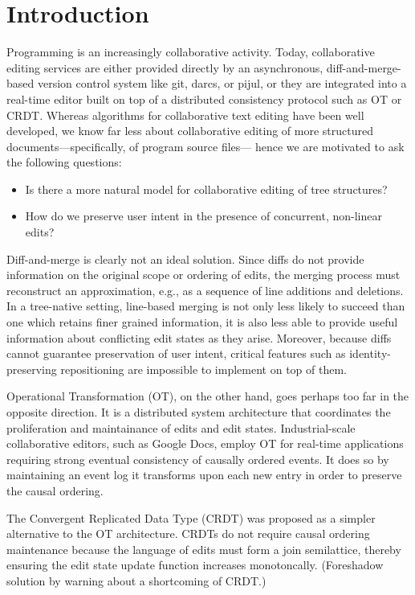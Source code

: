 
\section{Introduction}%
\label{sec:Introduction}


Programming is an increasingly collaborative activity.
Today, collaborative editing services are either provided directly by an asynchronous,
diff-and-merge-based version control system like git, darcs, or pijul,
or they are integrated into a real-time editor built on top of a distributed consistency protocol such as OT or CRDT.
Whereas algorithms for collaborative text editing have been well developed,
we know far less about collaborative editing of more structured documents---specifically, of program source files---%
hence we are motivated to ask the following questions:
\begin{itemize}
\item Is there a more natural model for collaborative editing of tree structures?
\item How do we preserve user intent in the presence of concurrent, non-linear edits?
\end{itemize}

Diff-and-merge is clearly not an ideal solution.
Since diffs do not provide information on the original scope or ordering of edits,
the merging process must reconstruct an approximation, e.g., as a sequence of line additions and deletions.
In a tree-native setting,
line-based merging is not only less likely to succeed than one which retains finer grained information,
it is also less able to provide useful information about conflicting edit states as they arise.
Moreover, because diffs cannot guarantee preservation of user intent,
critical features such as identity-preserving repositioning are impossible to implement on top of them.

Operational Transformation (OT), on the other hand, goes perhaps too far in the opposite direction.
It is a distributed system architecture that coordinates the proliferation and maintainance of edits and edit states.
Industrial-scale collaborative editors, such as Google Docs,
employ OT for real-time applications requiring strong eventual consistency of causally ordered events.
It does so by maintaining an event log it transforms upon each new entry in order to preserve the causal ordering.

The Convergent Replicated Data Type (CRDT) was proposed as a simpler alternative to the OT architecture.
CRDTs do not require causal ordering maintenance because the language of edits must form a join semilattice,
thereby ensuring the edit state update function increases monotoncally.
(Foreshadow solution by warning about a shortcoming of CRDT.)

